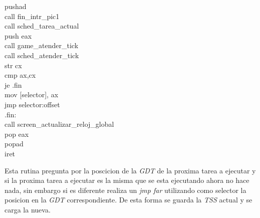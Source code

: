 \begin{center}

    pushad \\    
    call fin\_intr\_pic1 \\
    call sched\_tarea\_actual \\
    push eax    \\
    call game\_atender\_tick \\           
    call sched\_atender\_tick \\

    str cx \\
    cmp ax,cx \\
    je .fin \\
    mov [selector], ax \\
    jmp selector:offset \\

    .fin: \\
     call screen\_actualizar\_reloj\_global \\    
    pop eax \\
    popad \\
    iret \\

\end{center}

Esta rutina pregunta por la poscicion de la \textit{GDT}  de la proxima tarea a ejecutar y si la proxima tarea a ejecutar es la misma que se esta ejecutando ahora no hace nada, sin embargo si es diferente realiza un \textit{jmp far} utilizando como selector la posicion en la \textit{GDT} correspondiente. De esta forma se  guarda la \textit{TSS} actual y se carga la nueva. 


